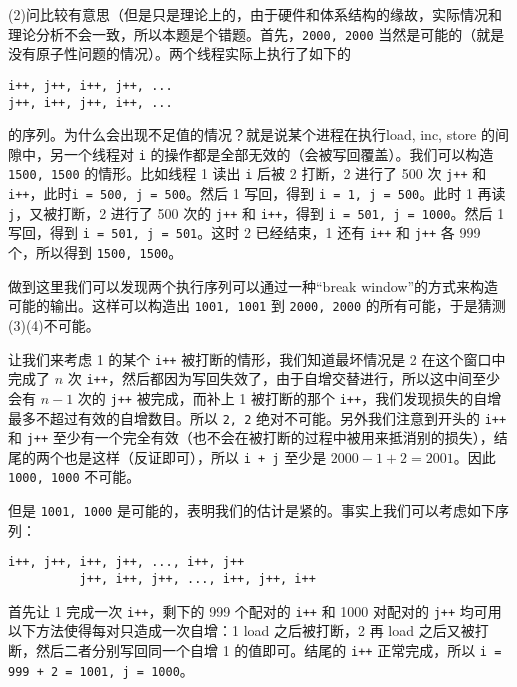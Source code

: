 \begin{problems}
        (2)问比较有意思（但是只是理论上的，由于硬件和体系结构的缘故，实际情况和理论分析不会一致，所以本题是个错题。首先，\verb|2000, 2000| 当然是可能的（就是没有原子性问题的情况）。两个线程实际上执行了如下的
        \begin{center}
            \verb|i++, j++, i++, j++, ...| \\
            \verb|j++, i++, j++, i++, ...|
        \end{center}
        的序列。为什么会出现不足值的情况？就是说某个进程在执行load, inc, store 的间隙中，另一个线程对 \verb|i| 的操作都是全部无效的（会被写回覆盖）。我们可以构造 \verb|1500, 1500| 的情形。比如线程 1 读出 \verb|i| 后被 2 打断，2 进行了 500 次 \verb|j++| 和 \verb|i++|，此时\verb|i = 500, j = 500|。然后 1 写回，得到 \verb|i = 1, j = 500|。此时 1 再读 \verb|j|，又被打断，2 进行了 500 次的 \verb|j++| 和 \verb|i++|，得到 \verb|i = 501, j = 1000|。然后 1 写回，得到 \verb|i = 501, j = 501|。这时 2 已经结束，1 还有 \verb|i++| 和 \verb|j++| 各 999 个，所以得到 \verb|1500, 1500|。
        
        做到这里我们可以发现两个执行序列可以通过一种“break window”的方式来构造可能的输出。这样可以构造出 \verb|1001, 1001| 到 \verb|2000, 2000| 的所有可能，于是猜测(3)(4)不可能。
        
        让我们来考虑 1 的某个 \verb|i++| 被打断的情形，我们知道最坏情况是 2 在这个窗口中完成了 $n$ 次 \verb|i++|，然后都因为写回失效了，由于自增交替进行，所以这中间至少会有 $n-1$ 次的 \verb|j++| 被完成，而补上 1 被打断的那个 \verb|i++|，我们发现损失的自增最多不超过有效的自增数目。所以 \verb|2, 2| 绝对不可能。另外我们注意到开头的 \verb|i++| 和 \verb|j++| 至少有一个完全有效（也不会在被打断的过程中被用来抵消别的损失），结尾的两个也是这样（反证即可），所以 \verb|i + j| 至少是 $2000-1+2=2001$。因此 \verb|1000, 1000| 不可能。
        
        但是 \verb|1001, 1000| 是可能的，表明我们的估计是紧的。事实上我们可以考虑如下序列：
        \begin{center}
            \verb|i++, j++, i++, j++, ..., i++, j++| \\
            \verb|          j++, i++, j++, ..., i++, j++, i++|
        \end{center}
        首先让 1 完成一次 \verb|i++|，剩下的 999 个配对的 \verb|i++| 和 1000 对配对的 \verb|j++| 均可用以下方法使得每对只造成一次自增：1 load 之后被打断，2 再 load 之后又被打断，然后二者分别写回同一个自增 1 的值即可。结尾的 \verb|i++| 正常完成，所以 \verb|i = 999 + 2 = 1001, j = 1000|。


\end{problems}
